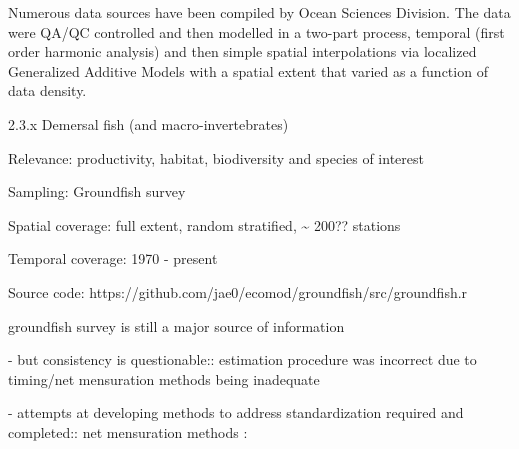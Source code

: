 \documentclass[letterpaper,portrait,12pt]{scrartcl}
\numberwithin{equation}{section}		%
\numberwithin{figure}{section}			%
\numberwithin{table}{section}				%
\begin{document}
Numerous data sources have been compiled by Ocean Sciences Division. The data were QA/QC controlled and then modelled in a two-part process, temporal (first order harmonic analysis) and then simple spatial interpolations via localized Generalized Additive Models with a spatial extent that varied as a function of data density. 
























2.3.x  Demersal fish (and macro-invertebrates)









Relevance:  productivity, habitat, biodiversity and species of interest




Sampling:  Groundfish survey 




Spatial coverage: full extent, random stratified, \~{} 200?? stations




Temporal coverage: 1970 - present




Source code: https://github.com/jae0/ecomod/groundfish/src/groundfish.r














groundfish survey is still a major source of information




- but consistency is questionable:: estimation procedure was incorrect due to timing/net mensuration methods being inadequate




- attempts at developing methods to address standardization required and completed:: net mensuration methods : 
\end{document}
